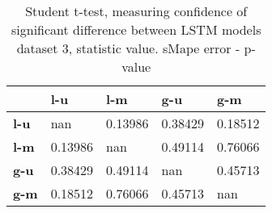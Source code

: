 \begin{table}[h]
\centering
\caption{Student t-test, measuring confidence of significant difference between LSTM models dataset 3, statistic value. sMape error - p-value}
\label{table:ttest-p-values-lstm-experiments-sMAPE-dataset-3}
\begin{tabular}{lllll}
\toprule
{} &      l-u &      l-m &      g-u &      g-m \\
\midrule
\textbf{l-u} &      nan &  0.13986 &  0.38429 &  0.18512 \\
\textbf{l-m} &  0.13986 &      nan &  0.49114 &  0.76066 \\
\textbf{g-u} &  0.38429 &  0.49114 &      nan &  0.45713 \\
\textbf{g-m} &  0.18512 &  0.76066 &  0.45713 &      nan \\
\bottomrule
\end{tabular}
\end{table}
